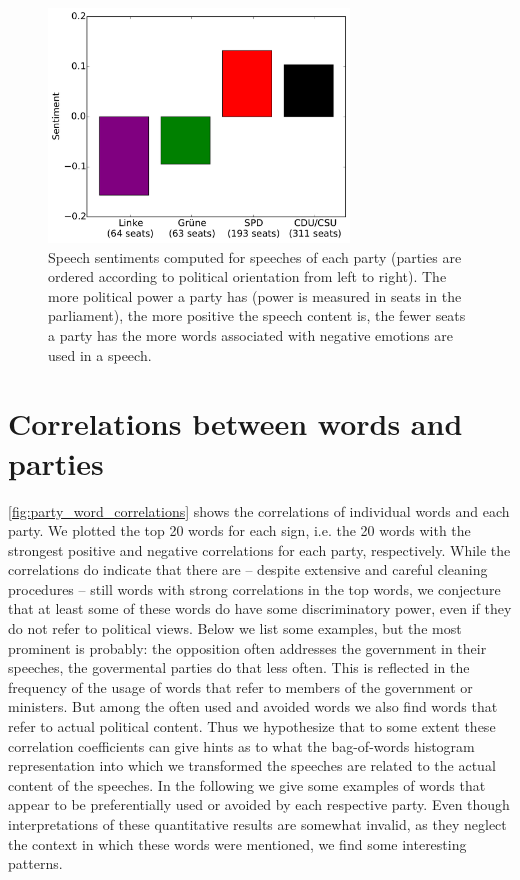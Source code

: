 \documentclass{article} %
\begin{document}
\begin{figure}
\begin{center}
\includegraphics[width=8cm]{party_sentiments.pdf} 
%
\end{center}
\caption{
\label{fig:party_sentiments}
Speech sentiments computed for speeches of each party (parties are ordered according to political orientation from left to right). The more political power a party has (power is measured in seats in the parliament), the more positive the speech content is, the fewer seats a party has the more words associated with negative emotions are used in a speech.
}
\end{figure}

\section{Correlations between words and parties}\label{sec:word_party_correlations}

\autoref{fig:party_word_correlations} shows the correlations of individual words and each party. We plotted the top 20 words for each sign, i.e. the 20 words with the strongest positive and negative correlations for each party, respectively. While the correlations do indicate that there are -- despite extensive and careful cleaning procedures -- still words with strong correlations in the top words, we conjecture that at least some of these words do have some discriminatory power, even if they do not refer to political views. Below we list some examples, but the most prominent is probably: the opposition often addresses the government in their speeches, the govermental parties do that less often. This is reflected in the frequency of the usage of words that refer to members of the government or ministers. But among the often used and avoided words we also find words that refer to actual political content. Thus we hypothesize that to some extent these correlation coefficients can give hints as to what the bag-of-words histogram representation into which we transformed the speeches are related to the actual content of the speeches. In the following we give some examples of words that appear to be preferentially used or avoided by each respective party. Even though interpretations of these quantitative results are somewhat invalid, as they neglect the context in which these words were mentioned, we find some interesting patterns. 
\end{document}
